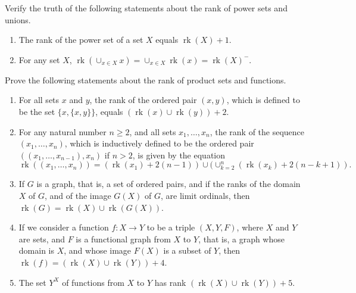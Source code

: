 \documentclass{article}
\begin{document}
\begin{exercise}
  \label{exe:8if1m3yy}
  Verify the truth of the following statements about the rank of power
  sets and unions.
  \begin{enumerate}
  \item The rank of the power set of a set \(X\) equals
    \(\operatorname{rk}(X) + 1\).
  \item For any set \(X\),
    \(\operatorname{rk}(\cup_{x \in X} x) = \cup_{x \in X}
    \operatorname{rk}(x) = \operatorname{rk}(X)^-\).
  \end{enumerate}
\end{exercise}

\begin{exercise}
  \label{exe:rtsfrlkv}
  Prove the following statements about the rank of product sets and
  functions.
  \begin{enumerate}
  \item For all sets \(x\) and \(y\), the rank of the ordered pair
    \((x, y)\), which is defined to be the set \(\{{x}, \{x, y\}\}\),
    equals \((\operatorname{rk}(x) \cup \operatorname{rk}(y)) + 2\).
  \item For any natural number \(n \geq 2\), and all sets
    \(x_1, \dotsc, x_n\), the rank of the sequence
    \((x_1, \dotsc, x_n)\), which is inductively defined to be the
    ordered pair \(((x_1, \dotsc, x_{n-1}), x_n)\) if \(n > 2\), is
    given by the equation
    \begin{displaymath}
      \operatorname{rk}((x_1, \dotsc,x_n)) =
      (\operatorname{rk}(x_1) + 2(n-1)) \cup
      (\cup_{k=2}^n (\operatorname{rk}(x_k) + 2(n-k+1)).
    \end{displaymath}
  \item If \(G\) is a graph, that is, a set of ordered pairs, and if
    the ranks of the domain \(X\) of \(G\), and of the image \(G(X)\)
    of \(G\), are limit ordinals, then
    \(\operatorname{rk}{(G)} = \operatorname{rk}(X) \cup
    \operatorname{rk}(G(X))\).
  \item If we consider a function \(f : X \to Y\) to be a triple
    \((X, Y, F)\), where \(X\) and \(Y\) are sets, and \(F\) is a
    functional graph from \(X\) to \(Y\), that is, a graph whose
    domain is \(X\), and whose image \(F(X)\) is a subset of \(Y\),
    then
    \(\operatorname{rk}(f) = (\operatorname{rk}(X) \cup
    \operatorname{rk}(Y)) + 4\).
  \item The set \(Y^X\) of functions from \(X\) to \(Y\) has rank
    \((\operatorname{rk}(X) \cup \operatorname{rk}(Y)) + 5\).
  \end{enumerate}
\end{exercise}
\end{document}
